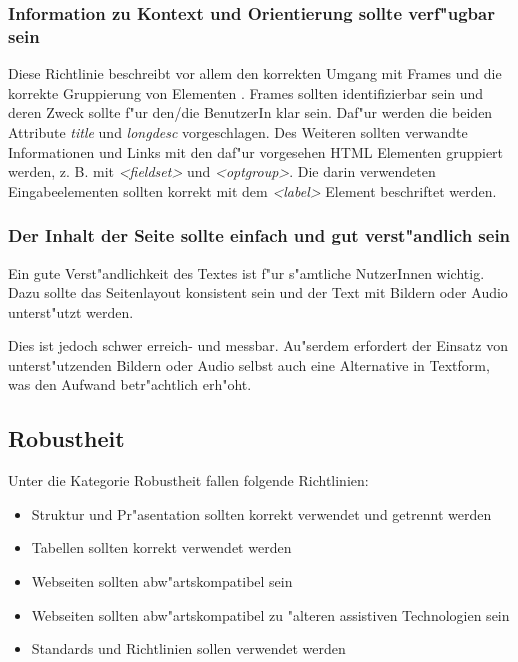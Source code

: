 \documentclass[a4paper,bibtotoc,oneside]{scrbook}
\begin{document}
\subsubsection{Information zu Kontext und Orientierung sollte verf"ugbar sein}
Diese Richtlinie beschreibt vor allem den korrekten Umgang mit Frames und die korrekte Gruppierung von Elementen \cite[S. 50]{barr_webd}. Frames sollten identifizierbar sein und deren Zweck sollte f"ur den/die BenutzerIn klar sein. Daf"ur werden die beiden Attribute \emph{title} und \emph{longdesc} vorgeschlagen. Des Weiteren sollten verwandte Informationen und Links mit den daf"ur vorgesehen HTML Elementen gruppiert werden, z. B. mit \emph{<fieldset>} und \emph{<optgroup>}. Die darin verwendeten Eingabeelementen sollten korrekt mit dem \emph{<label>} Element beschriftet werden. 
\cite[Abschnitt 6.12]{wcag1}

\subsubsection{Der Inhalt der Seite sollte einfach und gut verst"andlich sein}
Ein gute Verst"andlichkeit des Textes ist f"ur s"amtliche NutzerInnen wichtig. Dazu sollte das Seitenlayout konsistent sein und der Text mit Bildern oder Audio unterst"utzt werden. \cite[Abschnitt 6.14]{wcag1}

Dies ist jedoch schwer erreich- und messbar. Au"serdem erfordert der Einsatz von unterst"utzenden Bildern oder Audio selbst auch eine Alternative in Textform, was den Aufwand betr"achtlich erh"oht. \cite[S. 52]{barr_webd}

\subsection{Robustheit}
Unter die Kategorie Robustheit fallen folgende Richtlinien: 


\begin{itemize}
\item Struktur und Pr"asentation sollten korrekt verwendet und getrennt werden\cite[Abschnitt 6.3]{wcag1}
\item Tabellen sollten korrekt verwendet werden\cite[Abschnitt 6.5]{wcag1}
\item Webseiten sollten abw"artskompatibel sein\cite[Abschnitt 6.6]{wcag1}
\item Webseiten sollten abw"artskompatibel zu "alteren assistiven Technologien sein\cite[Abschnitt 6.10]{wcag1}
\item Standards und Richtlinien sollen verwendet werden\cite[Abschnitt 6.11]{wcag1}
\end{itemize}
\end{document}
